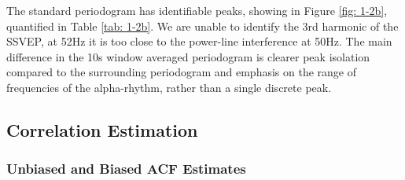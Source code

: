 \documentclass[12pt]{article}
\begin{document}
	The standard periodogram has identifiable peaks, showing in Figure \ref{fig: 1-2b}, quantified in Table \ref{tab: 1-2b}. We are unable to identify the 3rd harmonic of the SSVEP, at 52Hz it is too close to the power-line interference at 50Hz. The main difference in the 10s window averaged periodogram is clearer peak isolation compared to the surrounding periodogram and emphasis on the range of frequencies of the alpha-rhythm, rather than a single discrete peak.

	\subsection{Correlation Estimation} \label{sec: 1-3-correlation-est}
	
	\subsubsection{Unbiased and Biased ACF Estimates}
	
\end{document}
